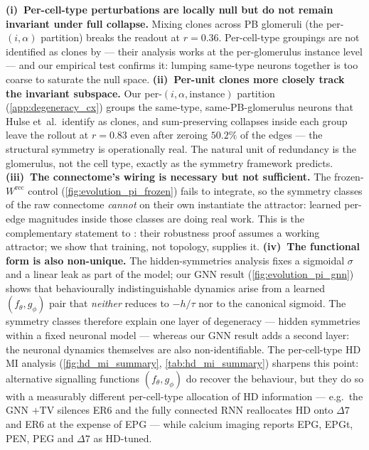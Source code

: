\documentclass[11pt]{article}
\begin{document}
\textbf{(i)~Per-cell-type perturbations are locally null but do not
remain invariant under full collapse.}
Mixing clones across PB glomeruli (the per-$(i,\alpha)$ partition)
breaks the readout at $r = 0.36$. Per-cell-type groupings are not
identified as clones by \citet{hulse2026} --- their analysis works
at the per-glomerulus instance level --- and our empirical test
confirms it: lumping same-type neurons together is too coarse to
saturate the null space.
\textbf{(ii)~Per-unit clones more closely track the invariant
subspace.} Our
per-$(i,\alpha,\mathrm{instance})$ partition (\cref{app:degeneracy_cx})
groups the same-type, same-PB-glomerulus neurons that Hulse
et~al.\ identify as clones, and sum-preserving collapses inside
each group leave the rollout at $r = 0.83$ even after zeroing
$50.2\%$ of the edges --- the structural symmetry is operationally
real. The natural unit of redundancy is the glomerulus, not the
cell type, exactly as the symmetry framework predicts.
\textbf{(iii)~The connectome's wiring is necessary
but not sufficient.} The frozen-$W^{\mathrm{rec}}$ control
(\cref{fig:evolution_pi_frozen}) fails to integrate, so the
symmetry classes of the raw connectome \emph{cannot} on their own
instantiate the attractor: learned per-edge magnitudes inside those
classes are doing real work. This is the complementary statement
to \citet{hulse2026}: their robustness proof assumes a working
attractor; we show that training, not topology, supplies it.
\textbf{(iv)~The functional form is also non-unique.} The
hidden-symmetries analysis fixes a sigmoidal $\sigma$ and a linear
leak as part of the model; our GNN result
(\cref{fig:evolution_pi_gnn}) shows that behaviourally indistinguishable
dynamics arise from a learned $(f_\theta, g_\phi)$ pair that
\emph{neither} reduces to $-h/\tau$ nor to the canonical sigmoid.
The symmetry classes therefore explain one layer of degeneracy ---
hidden symmetries within a fixed neuronal model --- whereas our GNN
result adds a second layer: the neuronal dynamics themselves are
also non-identifiable. The per-cell-type HD MI analysis
(\cref{fig:hd_mi_summary}, \cref{tab:hd_mi_summary}) sharpens this
point: alternative signalling functions $(f_\theta, g_\phi)$ do
recover the behaviour, but they do so with a measurably different
per-cell-type allocation of HD information --- e.g.\ the GNN $+$TV
silences ER6 and the fully connected RNN reallocates HD onto
$\Delta 7$ and ER6 at the expense of EPG --- while calcium imaging
\citep{seelig2015,kim2017,green2017} reports EPG, EPGt, PEN, PEG
and $\Delta 7$ as HD-tuned.
\end{document}
